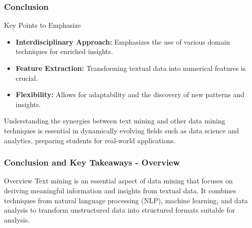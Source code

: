 \documentclass[aspectratio=169]{beamer}
\begin{document}
\begin{frame}[fragile]
    \frametitle{Conclusion}
    \begin{block}{Key Points to Emphasize}
        \begin{itemize}
            \item \textbf{Interdisciplinary Approach:} Emphasizes the use of various domain techniques for enriched insights.
            \item \textbf{Feature Extraction:} Transforming textual data into numerical features is crucial.
            \item \textbf{Flexibility:} Allows for adaptability and the discovery of new patterns and insights.
        \end{itemize}
    \end{block}

    Understanding the synergies between text mining and other data mining techniques is essential in dynamically evolving fields such as data science and analytics, preparing students for real-world applications.
\end{frame}

\begin{frame}[fragile]
    \frametitle{Conclusion and Key Takeaways - Overview}
    \begin{block}{Overview}
        Text mining is an essential aspect of data mining that focuses on deriving meaningful information and insights from textual data. 
        It combines techniques from natural language processing (NLP), machine learning, and data analysis to transform unstructured data into structured formats suitable for analysis.
    \end{block}
\end{frame}
\end{document}

